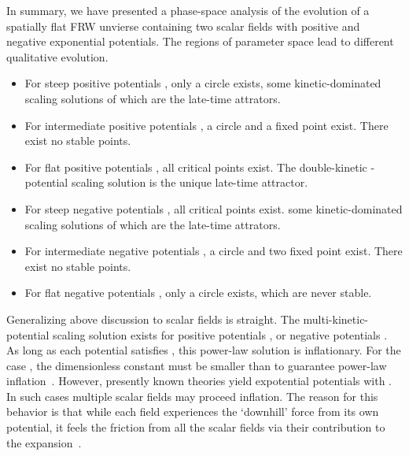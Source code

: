 \documentclass[a4paper,12pt]{article}
\begin{document}
In summary, we have presented a phase-space analysis of the
evolution of a spatially flat FRW unvierse containing two scalar
fields with positive and negative exponential potentials. The
regions of \myHighlight{$(\lambda )$}\coordHE{} parameter space lead to different
qualitative evolution.
\begin{itemize}
\item For steep positive potentials \coordHE{},
 only a circle \coordHE{} exists, some kinetic-dominated
 scaling solutions of which are the late-time attrators.
\item For intermediate positive potentials \coordHE{},
 a circle \coordHE{} and a fixed point \coordHE{} exist. There exist no stable
 points.
\item For flat positive potentials \coordHE{}, all
 critical points exist. The double-kinetic -potential scaling
 solution is the unique late-time attractor.
\item For steep
 negative potentials \coordHE{}, all critical points
 exist. some kinetic-dominated scaling solutions of which are the
 late-time attrators.
\item For intermediate negative potentials \coordHE{},
 a circle \coordHE{} and two fixed point \coordHE{} exist.
 There exist no stable points.
\item For flat negative potentials \coordHE{},
 only a circle \coordHE{} exists, which are never stable.
\end{itemize}


Generalizing above discussion to \coordHE{} scalar fields is straight.
The multi-kinetic-potential scaling solution exists for positive
potentials \coordHE{}, or negative potentials \coordHE{}. As long as each potential satisfies \coordHE{}, this
power-law solution is inflationary. For the case \coordHE{}, the
dimensionless constant \myHighlight{$\lambda$}\coordHE{} must be smaller than \coordHE{}
to guarantee power-law inflation~\cite{HW}. However, presently
known theories yield expotential potentials with \coordHE{}. In such cases multiple scalar fields may proceed
inflation. The reason for this behavior is that while each field
experiences the `downhill' force from its own potential, it feels
the friction from all the scalar fields via their contribution to
the expansion~\cite{LM}.
\end{document}
